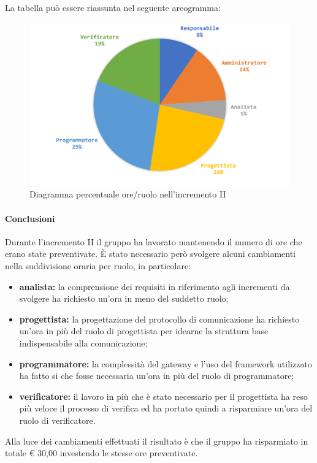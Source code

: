 			La tabella può essere riassunta nel seguente areogramma:
			\begin{figure}[H]
				\centering
				\includegraphics[width=0.8\linewidth]{images/consuntivo/ConsIncr2-2.png}
				\caption{Diagramma percentuale ore/ruolo nell'incremento II}
				\label{fig:consuntivo diagramma costi ruolo incremento II}
			\end{figure}

			\paragraph{Conclusioni}
			Durante l'incremento II il gruppo ha lavorato mantenendo il numero di ore che erano state preventivate. È stato necessario però svolgere alcuni cambiamenti nella suddivisione oraria per ruolo, in particolare:
			\begin{itemize}
				\item \textbf{analista:} la comprensione dei requisiti in riferimento agli incrementi da svolgere ha richiesto un'ora in meno del suddetto ruolo;
				\item \textbf{progettista:} la progettazione del protocollo di comunicazione ha richiesto un'ora in più del ruolo di progettista per idearne la struttura base indispensabile alla comunicazione;
				\item \textbf{programmatore:} la complessità del gateway e l'uso del framework utilizzato ha fatto si che fosse necessaria un'ora in più del ruolo di programmatore;
				\item \textbf{verificatore:} il lavoro in più che è stato necessario per il progettista ha reso più veloce il processo di verifica ed ha portato quindi a risparmiare un'ora del ruolo di verificatore.
			\end{itemize}
			Alla luce dei cambiamenti effettuati il risultato è che il gruppo ha risparmiato in totale € 30,00 investendo le stesse ore preventivate.
			\pagebreak
		
